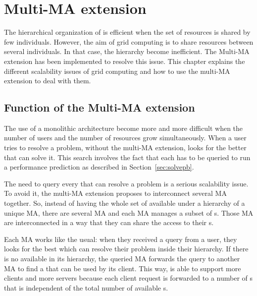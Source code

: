 
\chapter{Multi-MA extension}
\label{ch:multiMAextension}

The hierarchical organization of \diet is efficient when the set of
resources is shared by few individuals. However, the aim of grid
computing is to share resources between several individuals. In that
case, the \diet hierarchy become inefficient. The Multi-MA extension
has been implemented to resolve this issue. This chapter explains the
different scalability issues of grid computing and how to use the
multi-MA extension to deal with them.

\section{Function of the Multi-MA extension}

The use of a monolithic architecture become more and more difficult
when the number of users and the number of resources grow
simultaneously. When a user tries to resolve a problem, without the
multi-MA extension, \diet looks for the better \sed that can solve
it. This search involves the fact that each \sed has to be queried to
run a performance prediction as described in Section~\ref{sec:solvepb}.

The need to query every \sed that can resolve a problem is a serious
scalability issue. To avoid it, the multi-MA extension proposes to
interconnect several MA together. So, instead of having the whole set
of \sed available under a hierarchy of a unique MA, there are several
MA and each MA manages a subset of {\sed}s. Those MA are
interconnected in a way that they can share the access to their
{\sed}s.

Each MA works like the usual: when they received a query from a user,
they looks for the best \sed which can resolve their problem inside
their hierarchy. If there is no \sed available in its hierarchy, the
queried MA forwards the query to another MA to find a \sed that can be
used by its client. This way, \diet is able to support more clients
and more servers because each client request is forwarded to a number
of {\sed}s that is independent of the total number of available
{\sed}s.

